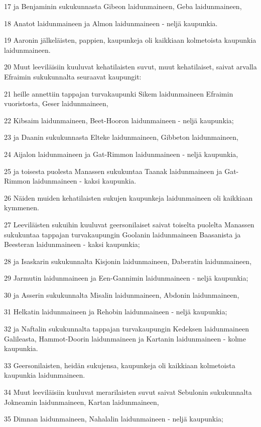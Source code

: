 \par 17 ja Benjaminin sukukunnasta Gibeon laidunmaineen, Geba laidunmaineen,
\par 18 Anatot laidunmaineen ja Almon laidunmaineen - neljä kaupunkia.
\par 19 Aaronin jälkeläisten, pappien, kaupunkeja oli kaikkiaan kolmetoista kaupunkia laidunmaineen.
\par 20 Muut leeviläisiin kuuluvat kehatilaisten suvut, muut kehatilaiset, saivat arvalla Efraimin sukukunnalta seuraavat kaupungit:
\par 21 heille annettiin tappajan turvakaupunki Sikem laidunmaineen Efraimin vuoristosta, Geser laidunmaineen,
\par 22 Kibsaim laidunmaineen, Beet-Hooron laidunmaineen - neljä kaupunkia;
\par 23 ja Daanin sukukunnasta Elteke laidunmaineen, Gibbeton laidunmaineen,
\par 24 Aijalon laidunmaineen ja Gat-Rimmon laidunmaineen - neljä kaupunkia,
\par 25 ja toisesta puolesta Manassen sukukuntaa Taanak laidunmaineen ja Gat-Rimmon laidunmaineen - kaksi kaupunkia.
\par 26 Näiden muiden kehatilaisten sukujen kaupunkeja laidunmaineen oli kaikkiaan kymmenen.
\par 27 Leeviläisten sukuihin kuuluvat geersonilaiset saivat toiselta puolelta Manassen sukukuntaa tappajan turvakaupungin Goolanin laidunmaineen Baasanista ja Beesteran laidunmaineen - kaksi kaupunkia;
\par 28 ja Isaskarin sukukunnalta Kisjonin laidunmaineen, Daberatin laidunmaineen,
\par 29 Jarmutin laidunmaineen ja Een-Gannimin laidunmaineen - neljä kaupunkia;
\par 30 ja Asserin sukukunnalta Misalin laidunmaineen, Abdonin laidunmaineen,
\par 31 Helkatin laidunmaineen ja Rehobin laidunmaineen - neljä kaupunkia;
\par 32 ja Naftalin sukukunnalta tappajan turvakaupungin Kedeksen laidunmaineen Galileasta, Hammot-Doorin laidunmaineen ja Kartanin laidunmaineen - kolme kaupunkia.
\par 33 Geersonilaisten, heidän sukujensa, kaupunkeja oli kaikkiaan kolmetoista kaupunkia laidunmaineen.
\par 34 Muut leeviläisiin kuuluvat merarilaisten suvut saivat Sebulonin sukukunnalta Jokneamin laidunmaineen, Kartan laidunmaineen,
\par 35 Dimnan laidunmaineen, Nahalalin laidunmaineen - neljä kaupunkia;
